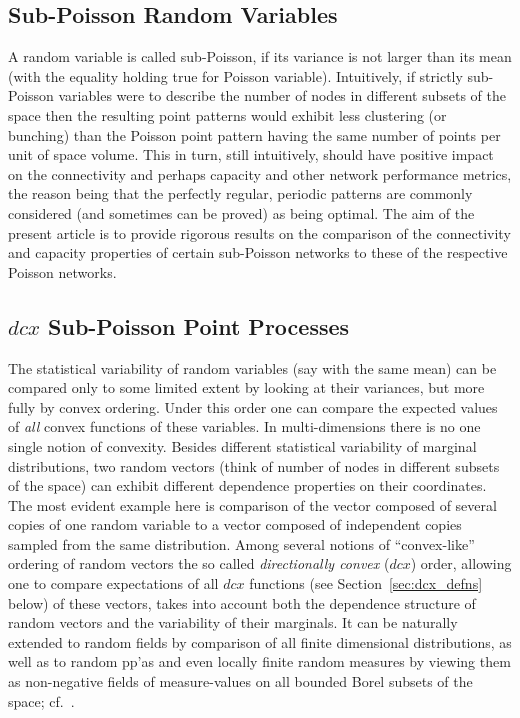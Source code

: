 \documentclass[conference]{IEEEtran}
\begin{document}
\subsection{Sub-Poisson Random Variables}
A random variable is called sub-Poisson, 
if its variance is not larger  than its mean (with the equality
holding true for Poisson variable).
Intuitively, if strictly sub-Poisson variables
were to describe the number of nodes in different subsets of the space
then the resulting point patterns would exhibit less clustering (or
bunching) than the Poisson point pattern having the same number of
points per unit of space volume. This in turn, still intuitively,
should have positive impact on the connectivity and perhaps  capacity
and  other network performance metrics, the reason being that
the perfectly regular, periodic patterns are commonly considered (and
sometimes can be proved) as being optimal. The aim of the present
article is to provide rigorous results on the comparison of the
connectivity and capacity properties of certain 
sub-Poisson networks to these  of the respective Poisson networks.

\subsection{$dcx$ Sub-Poisson  Point Processes}
The statistical variability of random variables (say with the same
mean) can be compared   
only to some limited extent by looking at their  variances, 
but more fully by convex ordering.
Under this order one can compare the expected values of {\em all} convex
functions of these variables. 
In multi-dimensions there is no one single notion of convexity.
Besides different statistical
variability of marginal distributions, two random vectors
(think of number of nodes in different subsets of the space) can
exhibit different dependence properties on their coordinates.
The most evident example here is comparison of the  vector
composed of several copies of one random variable to a vector
composed of independent copies sampled from the same distribution.
Among several notions of ``convex-like'' ordering of random vectors
the so called {\em directionally convex} ($dcx$) order, allowing one  to compare
expectations of all $dcx$ functions (see Section~\ref{sec:dcx_defns}
below) of these vectors,
takes into account both the  dependence structure of random
vectors and  the variability of their marginals.
It can be naturally extended to random fields by
comparison of all finite dimensional distributions,
as well as to random pp'as and even locally finite random 
measures by  viewing them as non-negative fields of
measure-values on all bounded Borel subsets of the space;
cf.~\cite{snorder}. 
\end{document}
